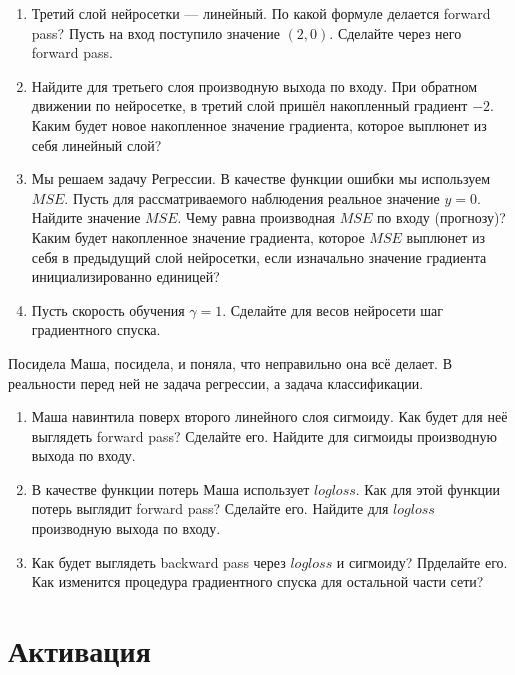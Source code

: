 \documentclass[12pt, a4paper, oneside]{article}
\theoremstyle{plain} %
\theoremstyle{definition}
\begin{document}
\begin{problem}
\begin{enumerate}
		\item Третий слой нейросетки --- линейный.  По какой формуле делается forward pass? Пусть на вход поступило значение $(2,0)$.  Сделайте через него forward pass. 
		
		\item Найдите для третьего слоя производную выхода по входу. При обратном движении по нейросетке, в третий слой пришёл накопленный градиент $-2$. Каким будет новое накопленное значение градиента, которое выплюнет из себя линейный слой? 
		
		\item Мы решаем задачу Регрессии. В качестве функции ошибки мы используем $MSE$. Пусть для рассматриваемого наблюдения реальное значение $y = 0$. Найдите значение $MSE$. Чему равна производная $MSE$ по входу (прогнозу)? Каким будет накопленное значение градиента, которое $MSE$ выплюнет из себя в предыдущий слой нейросетки, если изначально значение градиента инициализированно единицей? 
		
		\item Пусть скорость обучения $\gamma = 1$.  Сделайте для весов нейросети шаг градиентного спуска. 
	\end{enumerate}

		Посидела Маша, посидела, и поняла, что неправильно она всё делает. В реальности перед ней не задача регрессии, а задача классификации. 
	
	\begin{enumerate}	
		\item Маша навинтила поверх второго линейного слоя сигмоиду. Как будет для неё выглядеть forward pass? Сделайте его. Найдите для сигмоиды производную выхода по входу.
		
		\item В качестве функции потерь Маша использует $logloss.$ Как для этой функции потерь выглядит forward pass? Сделайте его. Найдите для $logloss$ производную выхода по входу. 
		
		\item Как будет выглядеть backward pass через $logloss$ и сигмоиду? Прделайте его. Как изменится процедура градиентного спуска для остальной части сети? 
	\end{enumerate}

\end{problem} 





\section{Активация} 
\end{document}

